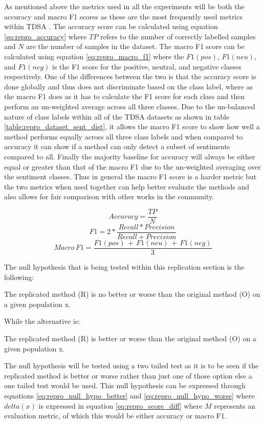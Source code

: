 As mentioned above the metrics used in all the experiments will be both the accuracy and macro F1 scores as these are the most frequently used metrics within TDSA \citep{repro_dong_2014,repro_wang_2017,repro_he_2018}. The accuracy score can be calculated using equation \ref{eq:repro_accuracy} where $TP$ refers to the number of correctly labelled samples and $N$ are the number of samples in the dataset. The macro F1 score can be calculated using equation \ref{eq:repro_macro_f1} where the $F1(pos)$, $F1(neu)$, and $F1(neg)$ is the F1 score for the positive, neutral, and negative classes respectively. One of the differences between the two is that the accuracy score is done globally and thus does not discriminate based on the class label, where as the macro F1 does as it has to calculate the F1 score for each class and then perform an un-weighted average across all three classes. Due to the un-balanced nature of class labels within all of the TDSA datasets as shown in table \ref{table:repro_dataset_sent_dist}, it allows the macro F1 score to show how well a method performs equally across all three class labels and when compared to accuracy it can show if a method can only detect a subset of sentiments compared to all. Finally the majority baseline for accuracy will always be either equal or greater than that of the macro F1 due to the un-weighted averaging over the sentiment classes. Thus in general the macro F1 score is a harder metric but the two metrics when used together can help better evaluate the methods and also allows for fair comparison with other works in the community.

\begin{equation}
    Accuracy = \frac{TP}{N}
    \label{eq:repro_accuracy}
\end{equation}
\begin{equation}
    F1 = 2 * \frac{Recall * Precision}{Recall + Precision}
\end{equation}
\begin{equation}
    Macro\, F1 = \frac{F1(pos)\, +\, F1(neu)\, + \, F1(neg)}{3}
    \label{eq:repro_macro_f1}
\end{equation}

The null hypothesis that is being tested within this replication section is the following: 
\begin{hyp}
The replicated method (R) is no better or worse than the original method (O) on a given population x. 
\label{hyp:repro_replication_null}
\end{hyp}
While the alternative is:
\begin{hyp}
The replicated method (R) is better or worse than the original method (O) on a given population x. 
\label{hyp:repro_replication_alt}
\end{hyp}
The null hypothesis will be tested using a two tailed test as it is to be seen if the replicated method is better or worse rather than just one of those option else a one tailed test would be used. This null hypothesis can be expressed through equations \ref{eq:repro_null_hypo_better} and \ref{eq:repro_null_hypo_worse} where $delta(x)$ is expressed in equation \ref{eq:repro_score_diff} where $M$ represents an evaluation metric, of which this would be either accuracy or macro F1.

